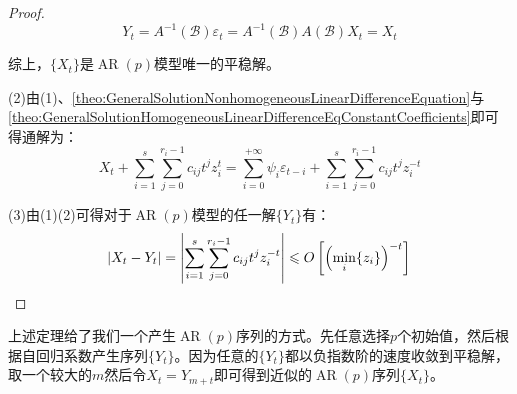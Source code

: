 \begin{proof}
\begin{equation*}
		Y_t=A^{-1}(\mathcal{B})\varepsilon_t=A^{-1}(\mathcal{B})A(\mathcal{B})X_t=X_t
	\end{equation*}\par
	综上，$\{X_t\}$是$\operatorname{AR}(p)$模型唯一的平稳解。\par
	(2)由(1)、\cref{theo:GeneralSolutionNonhomogeneousLinearDifferenceEquation}与\cref{theo:GeneralSolutionHomogeneousLinearDifferenceEqConstantCoefficients}即可得通解为：
	\begin{equation*}
		X_t+\sum_{i=1}^{s}\sum_{j=0}^{r_i-1}c_{ij}t^{j}z_i^t=\sum_{i=0}^{+\infty}\psi_i\varepsilon_{t-i}+\sum_{i=1}^{s}\sum_{j=0}^{r_i-1}c_{ij}t^{j}z_i^{-t}
	\end{equation*}\par
	(3)由(1)(2)可得对于$\operatorname{AR}(p)$模型的任一解$\{Y_t\}$有：
	\begin{equation*}
		|X_t-Y_t|=\left|\sum_{i=1}^{s}\sum_{j=0}^{r_i-1}c_{ij}t^{j}z_i^{-t}\right|\leqslant O\left[\left(\min_i\{z_i\}\right)^{-t}\right]\qedhere
	\end{equation*}
\end{proof}
\begin{note}
	上述定理给了我们一个产生$\operatorname{AR}(p)$序列的方式。先任意选择$p$个初始值，然后根据自回归系数产生序列$\{Y_t\}$。因为任意的$\{Y_t\}$都以负指数阶的速度收敛到平稳解，取一个较大的$m$然后令$X_t=Y_{m+t}$即可得到近似的$\operatorname{AR}(p)$序列$\{X_t\}$。
\end{note}
